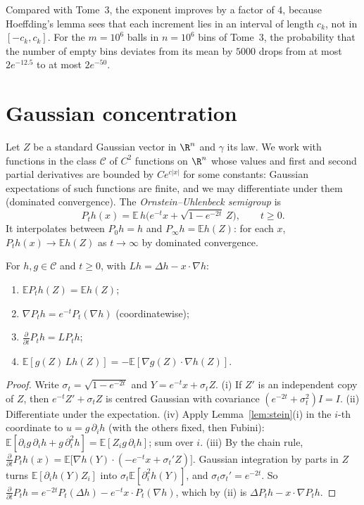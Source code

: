 Compared with Tome~3, the exponent improves by a factor of $4$, because Hoeffding's lemma sees that each increment lies in an interval of length $c_k$, not in
$[-c_k,c_k]$. For the $m=10^6$ balls in $n=10^6$ bins of Tome~3, the probability that the number of empty bins deviates from its mean by $5000$ drops from at most
$2e^{-12.5}$ to at most $2e^{-50}$.

\section{Gaussian concentration}

Let $Z$ be a standard Gaussian vector in $\R^n$ and $\gamma$ its law. We work with functions in the class $\mathcal C$ of $C^2$ functions on $\R^n$ whose values and first and
second partial derivatives are bounded by $Ce^{c|x|}$ for some constants: Gaussian expectations of such functions are finite, and we may differentiate under them
(dominated convergence). The \emph{Ornstein--Uhlenbeck semigroup} is
\[
P_th(x)=\mathbb E\,h\bigl(e^{-t}x+\sqrt{1-e^{-2t}}\,Z\bigr),\qquad t\ge0.
\]
It interpolates between $P_0h=h$ and $P_\infty h=\mathbb Eh(Z)$: for each $x$, $P_th(x)\to\mathbb Eh(Z)$ as $t\to\infty$ by dominated convergence.

\begin{lemma}\label{lem:ou}
For $h,g\in\mathcal C$ and $t\ge0$, with $Lh=\Delta h-x\cdot\nabla h$:
\begin{enumerate}[label=(\roman*)]
\item $\mathbb EP_th(Z)=\mathbb Eh(Z)$;
\item $\nabla P_th=e^{-t}P_t(\nabla h)$ (coordinatewise);
\item $\frac{\partial}{\partial t}P_th=LP_th$;
\item $\mathbb E[g(Z)\,Lh(Z)]=-\mathbb E[\nabla g(Z)\cdot\nabla h(Z)]$.
\end{enumerate}
\end{lemma}
\begin{proof}
Write $\sigma_t=\sqrt{1-e^{-2t}}$ and $Y=e^{-t}x+\sigma_tZ$. (i) If $Z'$ is an independent copy of $Z$, then $e^{-t}Z'+\sigma_tZ$ is centred Gaussian with covariance $(e^{-2t}+\sigma_t^2)I=I$.
(ii) Differentiate under the expectation. (iv) Apply Lemma~\ref{lem:stein}(i) in the $i$-th coordinate to $u=g\,\partial_ih$ (with the others fixed, then Fubini):
$\mathbb E[\partial_ig\,\partial_ih+g\,\partial_i^2h]=\mathbb E[Z_ig\,\partial_ih]$; sum over $i$. (iii) By the chain rule, $\frac{\partial}{\partial t}P_th(x)=\mathbb E\bigl[\nabla h(Y)\cdot(-e^{-t}x+\sigma_t'Z)\bigr]$.
Gaussian integration by parts in $Z$ turns $\mathbb E[\partial_ih(Y)Z_i]$ into $\sigma_t\mathbb E[\partial_i^2h(Y)]$, and $\sigma_t\sigma_t'=e^{-2t}$. So
$\frac{\partial}{\partial t}P_th=e^{-2t}P_t(\Delta h)-e^{-t}x\cdot P_t(\nabla h)$, which by (ii) is $\Delta P_th-x\cdot\nabla P_th$.
\end{proof}

